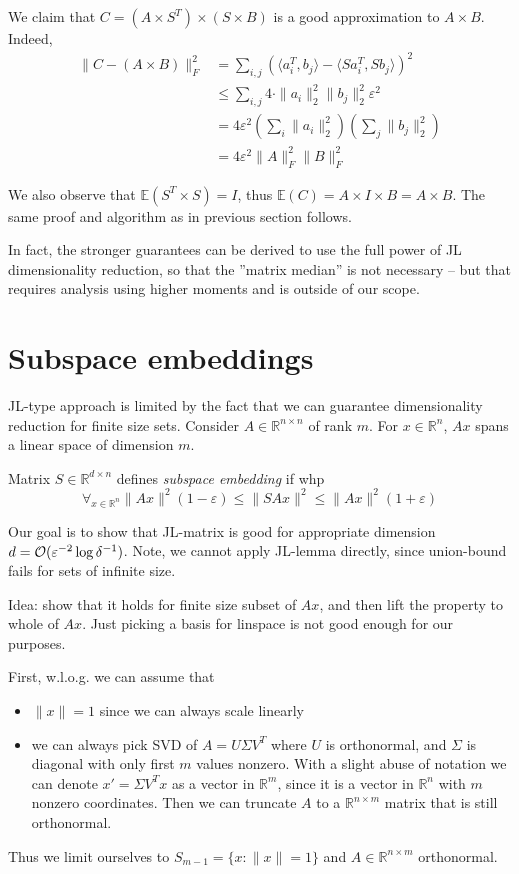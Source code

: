 \documentclass[11pt]{article}
\newcommand{\E}{{\mathbb E}}
\begin{document}
We claim that $C =(A \times S^T) \times (S \times B)$ is a good approximation to $A \times B$.
Indeed,
\begin{align*}
\|C - (A \times B)\|_F^2 &= \sum_{i,j} \left(\langle a_i^T,b_j\rangle - \langle Sa_i^T, Sb_j \rangle\right)^2\\
&\le  \sum_{i,j} 4 \cdot \|a_i\|_2^2 \|b_j\|_2^2 \varepsilon^2\\
&= 4\varepsilon^2 \left( \sum_i \|a_i\|_2^2 \right) \left( \sum_j \|b_j\|_2^2 \right)\\
&= 4 \varepsilon^2 \|A\|_F^2 \|B\|_F^2
\end{align*}

We also observe that $\E(S^T \times S) = I$, thus $\E(C) = A \times I \times B = A \times B$. The same proof and algorithm as in previous section follows.

In fact, the stronger guarantees can be derived to use the full power of JL dimensionality reduction, so that the ''matrix median'' is not necessary -- but that requires analysis using higher moments and is outside of our scope.

\section{Subspace embeddings}
JL-type approach is limited by the fact that we can guarantee dimensionality reduction for finite size sets. 
Consider $A \in \mathbb{R}^{n \times n}$ of rank $m$. For $x \in \mathbb{R}^n$, $Ax$ spans a linear space of dimension $m$.
\begin{definition}
Matrix $S \in \mathbb{R}^{d \times n}$ defines \emph{subspace embedding} if whp
$$ \forall_{x \in \mathbb{R}^n} \|Ax\|^2(1-\varepsilon) \le \|SAx\|^2 \le  \|Ax\|^2(1+\varepsilon) $$
\end{definition}

Our goal is to show that JL-matrix is good for appropriate dimension $d=\mathcal{O}(\varepsilon^{-2} \log \delta^{-1})$. Note, we cannot apply JL-lemma directly, since union-bound fails for sets of infinite size.

Idea: show that it holds for finite size subset of $Ax$, and then lift the property to whole of $Ax$. Just picking a basis for linspace is not good enough for our purposes.

First, w.l.o.g. we can assume that
\begin{itemize}
\item $\|x\|=1$ since we can always scale linearly
\item we can always pick SVD of $A = U \Sigma V^T$ where $U$ is orthonormal, and $\Sigma$ is diagonal with only first $m$ values nonzero. With a slight abuse of notation we can denote $x' = \Sigma V^T x$ as a vector in $\mathbb{R}^m$, since it is a vector in $\mathbb{R}^n$ with $m$ nonzero coordinates. Then we can truncate $A$ to a $\mathbb{R}^{n \times m}$ matrix that is still orthonormal.
\end{itemize}
Thus we limit ourselves to $S_{m-1} = \{x : \|x\| = 1\}$ and $A \in \mathbb{R}^{n \times m}$ orthonormal.
\end{document}
